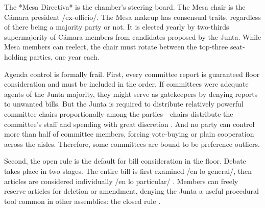 \documentclass[letter,12pt]{article}
\begin{document}

The *Mesa Directiva* is the chamber's steering board. The Mesa chair is the Cámara president /ex-officio/. The Mesa makeup has consensual traits, regardless of there being a majority party or not. It is elected yearly by two-thirds supermajority of Cámara members from candidates proposed by the Junta. While Mesa members can reelect, the chair must rotate between the top-three seat-holding parties, one year each. 



Agenda control is formally frail. First, every committee report is guaranteed floor consideration and must be included in the order. If committees were adequate agents of the Junta majority, they might serve as gatekeepers by denying reports to unwanted bills. But the Junta is required to distribute relatively powerful committee chairs proportionally among the parties---chairs distribute the committee's staff and spending with great discretion \citep{casar.2011}. And no party can control more than half of committee members, forcing vote-buying or plain cooperation across the aisles. Therefore, some committees are bound to be preference outliers.

Second, the open rule is the default for bill consideration in the floor. Debate takes place in two stages. The entire bill is first examined /en lo general/, then articles are considered individually /en lo particular/ \citep[see][]{heller.weldon.nd}. Members can freely reserve articles for deletion or amendment, denying the Junta a useful procedural tool common in other assemblies: the closed rule \citep[eg.,][]{cox.2006,dion.huber.1996}.
\end{document}
